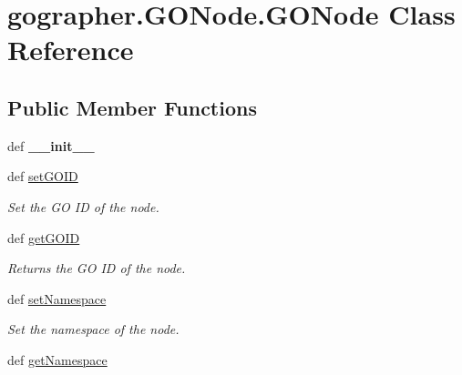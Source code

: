 \hypertarget{classgographer_1_1_g_o_node_1_1_g_o_node}{\section{gographer.\-G\-O\-Node.\-G\-O\-Node Class Reference}
\label{classgographer_1_1_g_o_node_1_1_g_o_node}
}
\subsection*{Public Member Functions}
\begin{DoxyCompactItemize}
\item 
\hypertarget{classgographer_1_1_g_o_node_1_1_g_o_node_ab82e5a00ea9b9a6c42be57512a95d5c1}{def {\bfseries \-\_\-\-\_\-init\-\_\-\-\_\-}}\label{classgographer_1_1_g_o_node_1_1_g_o_node_ab82e5a00ea9b9a6c42be57512a95d5c1}

\item 
def \hyperlink{classgographer_1_1_g_o_node_1_1_g_o_node_aad9563bd645b56b9dd16e425734c41b3}{set\-G\-O\-I\-D}
\begin{DoxyCompactList}\small\item\em Set the G\-O I\-D of the node. \end{DoxyCompactList}\item 
\hypertarget{classgographer_1_1_g_o_node_1_1_g_o_node_a26b818661d7d836fff2e813a846f4f4e}{def \hyperlink{classgographer_1_1_g_o_node_1_1_g_o_node_a26b818661d7d836fff2e813a846f4f4e}{get\-G\-O\-I\-D}}\label{classgographer_1_1_g_o_node_1_1_g_o_node_a26b818661d7d836fff2e813a846f4f4e}

\begin{DoxyCompactList}\small\item\em Returns the G\-O I\-D of the node. \end{DoxyCompactList}\item 
def \hyperlink{classgographer_1_1_g_o_node_1_1_g_o_node_a93c1d2b3080639b2159b81998187b8c3}{set\-Namespace}
\begin{DoxyCompactList}\small\item\em Set the namespace of the node. \end{DoxyCompactList}\item 
\hypertarget{classgographer_1_1_g_o_node_1_1_g_o_node_a8ef6fa408a68319d95fb2488753fd5fc}{def \hyperlink{classgographer_1_1_g_o_node_1_1_g_o_node_a8ef6fa408a68319d95fb2488753fd5fc}{get\-Namespace}}\label{classgographer_1_1_g_o_node_1_1_g_o_node_a8ef6fa408a68319d95fb2488753fd5fc}


\end{DoxyCompactItemize}
